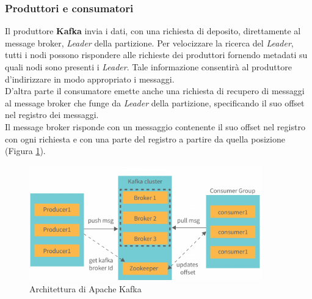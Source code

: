 \subsubsection{Produttori e consumatori}
Il produttore \textbf{Kafka} invia i dati, con una richiesta di deposito,  direttamente al \gls{message broker}{}, \textit{Leader} della partizione. Per velocizzare la ricerca del
\textit{Leader}, tutti i nodi possono rispondere alle richieste dei produttori fornendo \gls{metadati}{} su quali nodi sono presenti i \textit{Leader}. Tale informazione consentirà al produttore d'indirizzare in modo
appropriato i messaggi.\\
D'altra parte il consumatore emette anche una richiesta di recupero di messaggi al \gls{message broker}{} che funge da \textit{Leader} della partizione, specificando il suo offset nel registro dei messaggi.\\
Il \gls{message broker}{} risponde con un messaggio contenente il suo offset nel registro con ogni richiesta e con una parte del registro a partire da quella posizione (Figura \ref{fig:kafka_architecture}).
\begin{figure}[H]
    \centering
    \includegraphics[width=0.9\textwidth]{images/componenti/kafka_architetcture.png}
    \caption{Architettura di Apache Kafka}
    \label{fig:kafka_architecture}
\end{figure}
